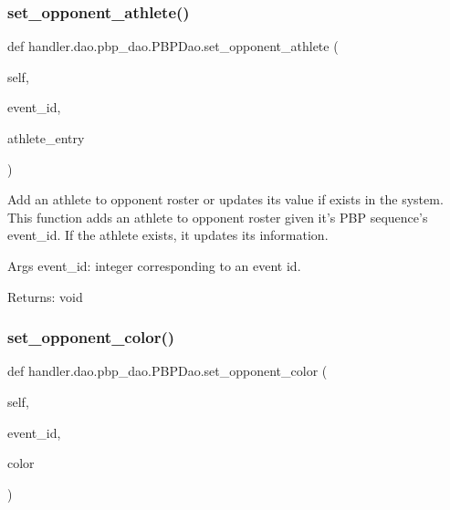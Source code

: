 \subsubsection{\texorpdfstring{set\+\_\+opponent\+\_\+athlete()}{set\_opponent\_athlete()}}
{\footnotesize\ttfamily def handler.\+dao.\+pbp\+\_\+dao.\+P\+B\+P\+Dao.\+set\+\_\+opponent\+\_\+athlete (\begin{DoxyParamCaption}\item[{}]{self,  }\item[{}]{event\+\_\+id,  }\item[{}]{athlete\+\_\+entry }\end{DoxyParamCaption})}

\begin{DoxyVerb}Add an athlete to opponent roster or updates its value if exists in the system.
This function adds an athlete to opponent roster given it's PBP sequence's event_id.
If the athlete exists, it updates its information.

Args
    event_id: integer corresponding to an event id.

Returns:
    void
\end{DoxyVerb}
 \mbox{\label{classhandler_1_1dao_1_1pbp__dao_1_1_p_b_p_dao_a46a33bcdaf5e87326884d2f05d3280a8}} 
\subsubsection{\texorpdfstring{set\+\_\+opponent\+\_\+color()}{set\_opponent\_color()}}
{\footnotesize\ttfamily def handler.\+dao.\+pbp\+\_\+dao.\+P\+B\+P\+Dao.\+set\+\_\+opponent\+\_\+color (\begin{DoxyParamCaption}\item[{}]{self,  }\item[{}]{event\+\_\+id,  }\item[{}]{color }\end{DoxyParamCaption})}

